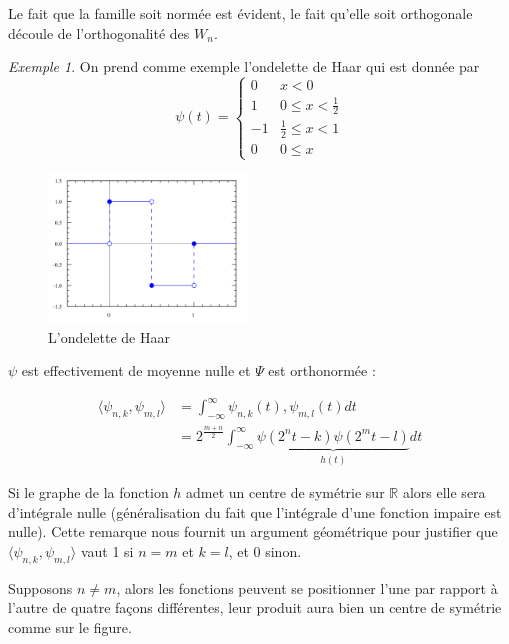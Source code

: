 \documentclass[]{article}
\theoremstyle{remark}
\newtheorem{myexmpl}{Exemple}
\theoremstyle{definition}
\begin{document}
	Le fait que la famille soit normée est évident, le fait qu'elle soit orthogonale découle de l'orthogonalité des $W_n$.
	
	\begin{myexmpl}
		On prend comme exemple l'ondelette de Haar qui est donnée par $$\psi(t) = \left\{
		\begin{array}{cl}
			0 & x < 0 \\
			1 & 0 \leqslant x < \frac{1}{2} \\
			-1 & \frac{1}{2} \leqslant x < 1 \\
			0 & 0 \leqslant x
		\end{array}
		\right.$$
	\end{myexmpl}
	
	\begin{figure}[h]
		\label{Haar}
		\centering
		\includegraphics[width=150pt]{Haar.png}
		\caption{L'ondelette de Haar}
	\end{figure}
	
	$\psi$ est effectivement de moyenne nulle et $\Psi$ est orthonormée :
	
	\begin{align*}
		\langle \psi_{n, k}, \psi_{m, l}\rangle &= \int_{-\infty}^{\infty} \psi_{n, k}(t), \psi_{m, l}(t) dt \\
		&= 2^{\frac{m+n}{2}} \int_{-\infty}^{\infty} \underbrace{\psi(2^nt - k) \psi(2^mt - l)}_{h(t)} dt
	\end{align*}
	
	Si le graphe de la fonction $h$ admet un centre de symétrie sur $\mathbb{R}$ alors elle sera d'intégrale nulle (généralisation du fait que l'intégrale d'une fonction impaire est nulle). Cette remarque nous fournit un argument géométrique pour justifier que $\langle \psi_{n, k}, \psi_{m, l}\rangle$ vaut 1 si $n = m$ et $k = l$, et 0 sinon.
	
	Supposons $n \neq m$, alors les fonctions peuvent se positionner l'une par rapport à l'autre de quatre façons différentes, leur produit aura bien un centre de symétrie comme sur le figure.
		
\end{document}
